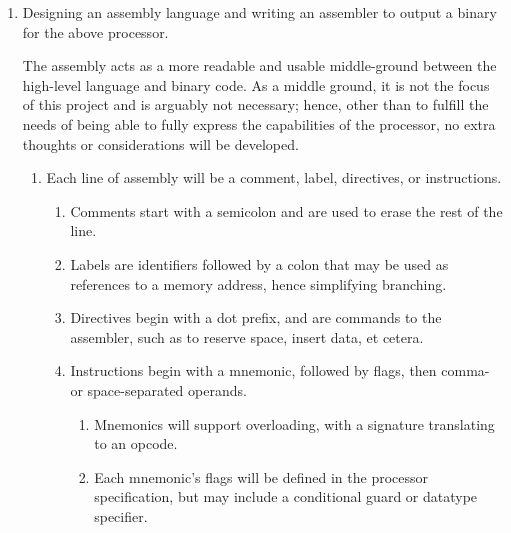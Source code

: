 \documentclass{article}
\begin{document}
\begin{enumerate}
        \item Designing an assembly language and writing an assembler to output a binary for the above processor.

        The assembly acts as a more readable and usable middle-ground between the high-level language and binary code.
        As a middle ground, it is not the focus of this project and is arguably not necessary;
        hence, other than to fulfill the needs of being able to fully express the capabilities of the processor, no extra thoughts or considerations will be developed.
        \begin{enumerate}
            \item Each line of assembly will be a comment, label, directives, or instructions.
            \begin{enumerate}
                \item Comments start with a semicolon and are used to erase the rest of the line.
                \item Labels are identifiers followed by a colon that may be used as references to a memory address, hence simplifying branching.
                \item Directives begin with a dot prefix, and are commands to the assembler, such as to reserve space, insert data, et cetera.
                \item Instructions begin with a mnemonic, followed by flags, then comma- or space-separated operands.
                \begin{enumerate}
                    \item Mnemonics will support overloading, with a signature translating to an opcode.
                    \item Each mnemonic's flags will be defined in the processor specification, but may include a conditional guard or datatype specifier.
                \end{enumerate}
            \end{enumerate}
        \end{enumerate}


\end{enumerate}
\end{document}
